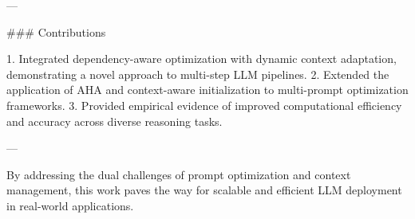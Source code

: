 ---

### Contributions

1. Integrated dependency-aware optimization with dynamic context adaptation, demonstrating a novel approach to multi-step LLM pipelines.
2. Extended the application of AHA and context-aware initialization to multi-prompt optimization frameworks.
3. Provided empirical evidence of improved computational efficiency and accuracy across diverse reasoning tasks.

---

By addressing the dual challenges of prompt optimization and context management, this work paves the way for scalable and efficient LLM deployment in real-world applications.